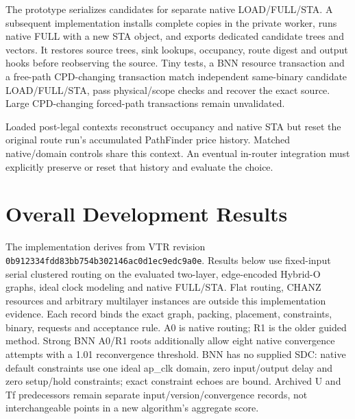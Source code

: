 \documentclass[conference,10pt]{IEEEtran}
\begin{document}
The prototype serializes candidates for separate native LOAD/FULL/STA. A subsequent implementation installs complete copies in the private worker, runs native FULL with a new STA object, and exports dedicated candidate trees and vectors. It restores source trees, sink lookups, occupancy, route digest and output hooks before reobserving the source. Tiny tests, a BNN resource transaction and a free-path CPD-changing transaction match independent same-binary candidate LOAD/FULL/STA, pass physical/scope checks and recover the exact source. Large CPD-changing forced-path transactions remain unvalidated.

Loaded post-legal contexts reconstruct occupancy and native STA but reset the original route run's accumulated PathFinder price history. Matched native/domain controls share this context. An eventual in-router integration must explicitly preserve or reset that history and evaluate the choice.

\section{Overall Development Results}
The implementation derives from VTR revision \texttt{0b912334fdd83bb754b302146ac0d1ec9edc9a0e}. Results below use fixed-input serial clustered routing on the evaluated two-layer, edge-encoded Hybrid-O graphs, ideal clock modeling and native FULL/STA. Flat routing, CHANZ resources and arbitrary multilayer instances are outside this implementation evidence. Each record binds the exact graph, packing, placement, constraints, binary, requests and acceptance rule. A0 is native routing; R1 is the older guided method. Strong BNN A0/R1 roots additionally allow eight native convergence attempts with a 1.01 reconvergence threshold. BNN has no supplied SDC: native default constraints use one ideal ap\_clk domain, zero input/output delay and zero setup/hold constraints; exact constraint echoes are bound. Archived U and Tf predecessors remain separate input/version/convergence records, not interchangeable points in a new algorithm's aggregate score.
\end{document}
